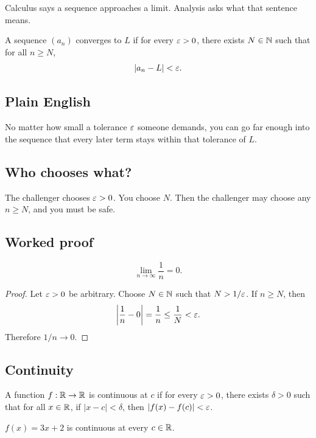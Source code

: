\documentclass[12pt]{article}
\begin{document}
Calculus says a sequence approaches a limit. Analysis asks what that sentence means.

\begin{definition}
A sequence $(a_n)$ converges to $L$ if for every $\varepsilon>0$, there exists $N\in\mathbb{N}$ such that for all $n\geq N$,
\[
|a_n-L|<\varepsilon.
\]
\end{definition}

\subsection{Plain English}

No matter how small a tolerance $\varepsilon$ someone demands, you can go far enough into the sequence that every later term stays within that tolerance of $L$.

\subsection{Who chooses what?}

The challenger chooses $\varepsilon>0$. You choose $N$. Then the challenger may choose any $n\geq N$, and you must be safe.

\subsection{Worked proof}

\begin{theorem}
\[
\lim_{n\to\infty}\frac1n=0.
\]
\end{theorem}

\begin{proof}
Let $\varepsilon>0$ be arbitrary. Choose $N\in\mathbb{N}$ such that $N>1/\varepsilon$. If $n\geq N$, then
\[
\left|\frac1n-0\right|=\frac1n\leq\frac1N<\varepsilon.
\]
Therefore $1/n\to0$.
\end{proof}

\subsection{Continuity}

\begin{definition}
A function $f:\mathbb{R}\to\mathbb{R}$ is continuous at $c$ if for every $\varepsilon>0$, there exists $\delta>0$ such that for all $x\in\mathbb{R}$, if $|x-c|<\delta$, then $|f(x)-f(c)|<\varepsilon$.
\end{definition}

\begin{theorem}
$f(x)=3x+2$ is continuous at every $c\in\mathbb{R}$.
\end{theorem}
\end{document}
